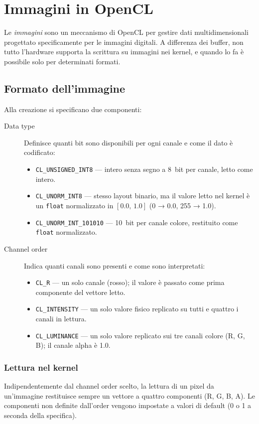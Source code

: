 \chapter{Immagini in OpenCL}\label{sec:opencl_images}

Le \emph{immagini} sono un meccanismo di OpenCL per gestire dati multidimensionali progettato specificamente per le immagini digitali. A differenza dei buffer, non tutto l'hardware supporta la scrittura su immagini nei kernel, e quando lo fa è possibile solo per determinati formati.

\section{Formato dell'immagine}
Alla creazione si specificano due componenti:

\begin{description}
    \item[Data type] Definisce quanti bit sono disponibili per ogni canale e come il dato è codificato:
    \begin{itemize}
        \item \texttt{CL\_UNSIGNED\_INT8} — intero senza segno a 8~bit per canale, letto come intero.
        \item \texttt{CL\_UNORM\_INT8} — stesso layout binario, ma il valore letto nel kernel è un \texttt{float} normalizzato in $[0.0,\,1.0]$ (0 → 0.0, 255 → 1.0).
        \item \texttt{CL\_UNORM\_INT\_101010} — 10~bit per canale colore, restituito come \texttt{float} normalizzato.
    \end{itemize}

    \item[Channel order] Indica quanti canali sono presenti e come sono interpretati:
    \begin{itemize}
        \item \texttt{CL\_R} — un solo canale (rosso); il valore è passato come prima componente del vettore letto.
        \item \texttt{CL\_INTENSITY} — un solo valore fisico replicato su tutti e quattro i canali in lettura.
        \item \texttt{CL\_LUMINANCE} — un solo valore replicato sui tre canali colore (R, G, B); il canale alpha è 1.0.
    \end{itemize}
\end{description}

\subsection{Lettura nel kernel}
Indipendentemente dal channel order scelto, la lettura di un pixel da un'immagine restituisce sempre un vettore a quattro componenti (R, G, B, A). Le componenti non definite dall'order vengono impostate a valori di default (0 o 1 a seconda della specifica).